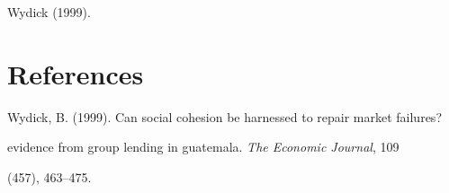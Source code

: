 \documentclass{article}
\begin{document}
\blindtext Wydick (1999).

\section*{References}

Wydick, B. (1999). Can social cohesion be harnessed to repair market failures? 

evidence from group lending in guatemala. \textit{The Economic Journal}, 109 

(457), 463–475.
\end{document}
